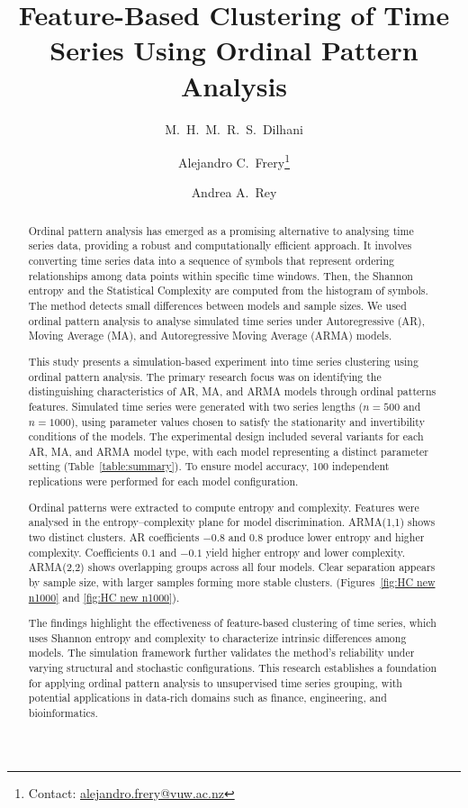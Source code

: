 \documentclass[11pt,a4paper]{article}
\title{\vspace{-1cm}Feature-Based Clustering of Time Series Using Ordinal Pattern Analysis\vspace{-0.3cm}}
\author[1]{M.\ H.\ M.\ R.\ S.\ Dilhani}
\author[1]{Alejandro C.\ Frery\thanks{Contact: %
		\href{mailto:alejandro.frery@vuw.ac.nz}{alejandro.frery@vuw.ac.nz}}}
\author[2]{Andrea A.\ Rey}
\affil[1]{School of Mathematics and Statistics, Victoria University of Wellington, New Zealand}
\affil[2]{Laboratorio de Investigación y Desarrollo Experimental en Computación (LIDEC), Instituto de Tecnología e Ingeniería, Universidad Nacional de Hurlingham (UNAHUR), Argentina}
\date{}
\begin{document}
	\maketitle
	\vspace{-0.5cm}
	
	\begin{abstract}
	
	
Ordinal pattern analysis has emerged as a promising alternative to analysing time series data, providing a robust and computationally efficient approach. 
It involves converting time series data into a sequence of symbols that represent ordering relationships among data points within specific time windows.  
Then, the Shannon entropy and the Statistical Complexity are computed from the histogram of symbols. 
The method detects small differences between models and sample sizes.
We used ordinal pattern analysis to analyse simulated time series under Autoregressive (AR), Moving Average (MA), and Autoregressive Moving Average (ARMA) models. 
	
This study presents a simulation-based experiment into time series clustering using ordinal pattern analysis. 
The primary research focus was on identifying the distinguishing characteristics of AR, MA, and ARMA models through ordinal patterns features. 
Simulated time series were generated with two series lengths ($n = 500$ and $n = 1000$), using parameter values chosen to satisfy the stationarity and invertibility conditions of the models. 
The experimental design included several variants for each AR, MA, and ARMA model type, with each model representing a distinct parameter setting (Table~\ref{table:summary}). 
To ensure model accuracy, 100 independent replications were performed for each model configuration.

Ordinal patterns were extracted to compute entropy and complexity. 
Features were analysed in the entropy–complexity plane for model discrimination. 
ARMA(1,1) shows two distinct clusters.
AR coefficients $-0.8$ and $0.8$ produce lower entropy and higher complexity. 
Coefficients $0.1$ and $-0.1$ yield higher entropy and lower complexity. 
ARMA(2,2) shows overlapping groups across all four models. 
Clear separation appears by sample size, with larger samples forming more stable clusters. (Figures~\ref{fig:HC new n1000} and \ref{fig:HC new n1000}).

The findings highlight the effectiveness of feature-based clustering of time series, which uses Shannon entropy and complexity to characterize intrinsic differences among models. 
The simulation framework further validates the method’s reliability under varying structural and stochastic configurations. 
This research establishes a foundation for applying ordinal pattern analysis to unsupervised time series grouping, with potential applications in data-rich domains such as finance, engineering, and bioinformatics.
	
\end{abstract}
\end{document}
